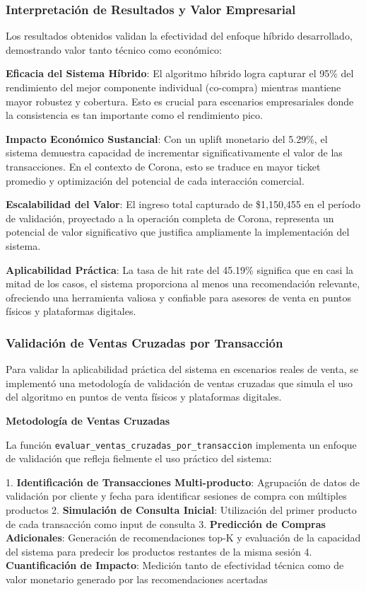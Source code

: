 \documentclass[twocolumn]{article}
\begin{document}
\subsubsection{Interpretación de Resultados y Valor Empresarial}

Los resultados obtenidos validan la efectividad del enfoque híbrido desarrollado, demostrando valor tanto técnico como económico:

\textbf{Eficacia del Sistema Híbrido}: El algoritmo híbrido logra capturar el 95\% del rendimiento del mejor componente individual (co-compra) mientras mantiene mayor robustez y cobertura. Esto es crucial para escenarios empresariales donde la consistencia es tan importante como el rendimiento pico.

\textbf{Impacto Económico Sustancial}: Con un uplift monetario del 5.29\%, el sistema demuestra capacidad de incrementar significativamente el valor de las transacciones. En el contexto de Corona, esto se traduce en mayor ticket promedio y optimización del potencial de cada interacción comercial.

\textbf{Escalabilidad del Valor}: El ingreso total capturado de \$1,150,455 en el período de validación, proyectado a la operación completa de Corona, representa un potencial de valor significativo que justifica ampliamente la implementación del sistema.

\textbf{Aplicabilidad Práctica}: La tasa de hit rate del 45.19\% significa que en casi la mitad de los casos, el sistema proporciona al menos una recomendación relevante, ofreciendo una herramienta valiosa y confiable para asesores de venta en puntos físicos y plataformas digitales.

\subsubsection{Validación de Ventas Cruzadas por Transacción}

Para validar la aplicabilidad práctica del sistema en escenarios reales de venta, se implementó una metodología de validación de ventas cruzadas que simula el uso del algoritmo en puntos de venta físicos y plataformas digitales.

\textbf{Metodología de Ventas Cruzadas}

La función \texttt{evaluar\_ventas\_cruzadas\_por\_transaccion} implementa un enfoque de validación que refleja fielmente el uso práctico del sistema:

1. \textbf{Identificación de Transacciones Multi-producto}: Agrupación de datos de validación por cliente y fecha para identificar sesiones de compra con múltiples productos
2. \textbf{Simulación de Consulta Inicial}: Utilización del primer producto de cada transacción como input de consulta
3. \textbf{Predicción de Compras Adicionales}: Generación de recomendaciones top-K y evaluación de la capacidad del sistema para predecir los productos restantes de la misma sesión
4. \textbf{Cuantificación de Impacto}: Medición tanto de efectividad técnica como de valor monetario generado por las recomendaciones acertadas
\end{document}
